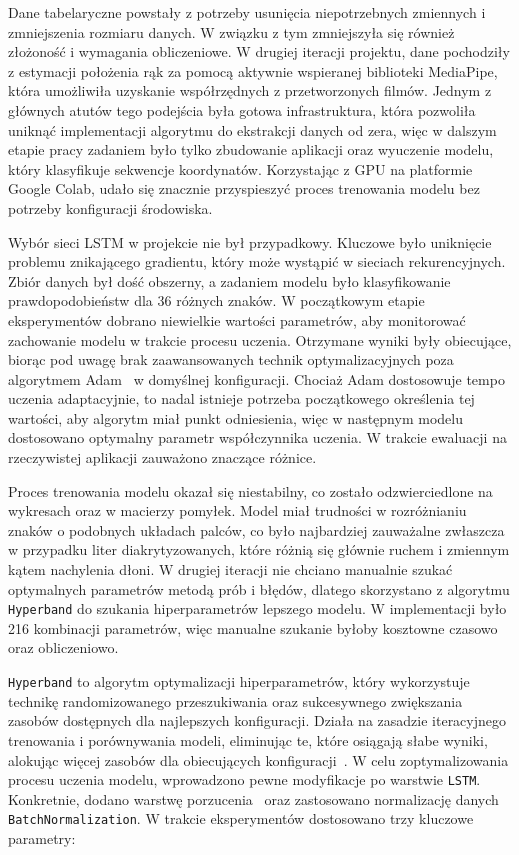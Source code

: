 Dane tabelaryczne powstały z potrzeby usunięcia niepotrzebnych zmiennych i zmniejszenia rozmiaru danych. W związku z tym zmniejszyła się również złożoność i wymagania obliczeniowe. W drugiej iteracji projektu, dane pochodziły z estymacji położenia rąk za pomocą aktywnie wspieranej biblioteki MediaPipe, która umożliwiła uzyskanie współrzędnych z przetworzonych filmów. Jednym z głównych atutów tego podejścia była gotowa infrastruktura, która pozwoliła uniknąć implementacji algorytmu do ekstrakcji danych od zera, więc w dalszym etapie pracy zadaniem było tylko zbudowanie aplikacji oraz wyuczenie modelu, który klasyfikuje sekwencje koordynatów. Korzystając z GPU na platformie Google Colab, udało się znacznie przyspieszyć proces trenowania modelu bez potrzeby konfiguracji środowiska.

Wybór sieci LSTM w projekcie nie był przypadkowy. Kluczowe było uniknięcie problemu znikającego gradientu, który może wystąpić w sieciach rekurencyjnych. Zbiór danych był dość obszerny, a zadaniem modelu było klasyfikowanie prawdopodobieństw dla 36 różnych znaków. W początkowym etapie eksperymentów dobrano niewielkie wartości parametrów, aby monitorować zachowanie modelu w trakcie procesu uczenia. Otrzymane wyniki były obiecujące, biorąc pod uwagę brak zaawansowanych technik optymalizacyjnych poza algorytmem Adam~\cite{kingma2015} w domyślnej konfiguracji. Chociaż Adam dostosowuje tempo uczenia adaptacyjnie, to nadal istnieje potrzeba początkowego określenia tej wartości, aby algorytm miał punkt odniesienia, więc w następnym modelu dostosowano optymalny parametr współczynnika uczenia. W trakcie ewaluacji na rzeczywistej aplikacji zauważono znaczące różnice.

Proces trenowania modelu okazał się niestabilny, co zostało odzwierciedlone na wykresach oraz w macierzy pomyłek. Model miał trudności w rozróżnianiu znaków o podobnych układach palców, co było najbardziej zauważalne zwłaszcza w przypadku liter diakrytyzowanych, które różnią się głównie ruchem i zmiennym kątem nachylenia dłoni. W drugiej iteracji nie chciano manualnie szukać optymalnych parametrów metodą prób i błędów, dlatego skorzystano z algorytmu \texttt{Hyperband} do szukania hiperparametrów lepszego modelu. W implementacji było 216 kombinacji parametrów, więc manualne szukanie byłoby kosztowne czasowo oraz obliczeniowo.

\texttt{Hyperband} to algorytm optymalizacji hiperparametrów, który wykorzystuje technikę randomizowanego przeszukiwania oraz sukcesywnego zwiększania zasobów dostępnych dla najlepszych konfiguracji. Działa na zasadzie iteracyjnego trenowania i porównywania modeli, eliminując te, które osiągają słabe wyniki, alokując więcej zasobów dla obiecujących konfiguracji~\cite{li2017}. W celu zoptymalizowania procesu uczenia modelu, wprowadzono pewne modyfikacje po warstwie \texttt{LSTM}. Konkretnie, dodano warstwę porzucenia~\cite{hinton2012} oraz zastosowano normalizację danych \texttt{BatchNormalization}. W trakcie eksperymentów dostosowano trzy kluczowe parametry:

